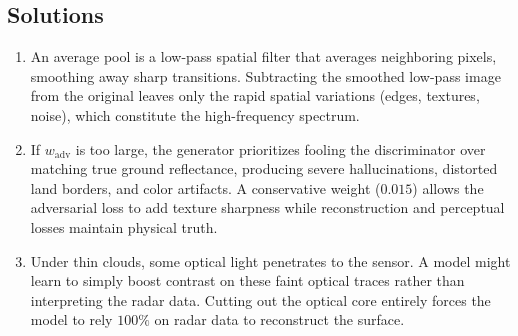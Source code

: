 \subsection*{Solutions}
\begin{enumerate}
    \item An average pool is a low-pass spatial filter that averages neighboring pixels, smoothing away sharp transitions. Subtracting the smoothed low-pass image from the original leaves only the rapid spatial variations (edges, textures, noise), which constitute the high-frequency spectrum.
    \item If $w_{\text{adv}}$ is too large, the generator prioritizes fooling the discriminator over matching true ground reflectance, producing severe hallucinations, distorted land borders, and color artifacts. A conservative weight ($0.015$) allows the adversarial loss to add texture sharpness while reconstruction and perceptual losses maintain physical truth.
    \item Under thin clouds, some optical light penetrates to the sensor. A model might learn to simply boost contrast on these faint optical traces rather than interpreting the radar data. Cutting out the optical core entirely forces the model to rely $100\%$ on radar data to reconstruct the surface.
\end{enumerate}
